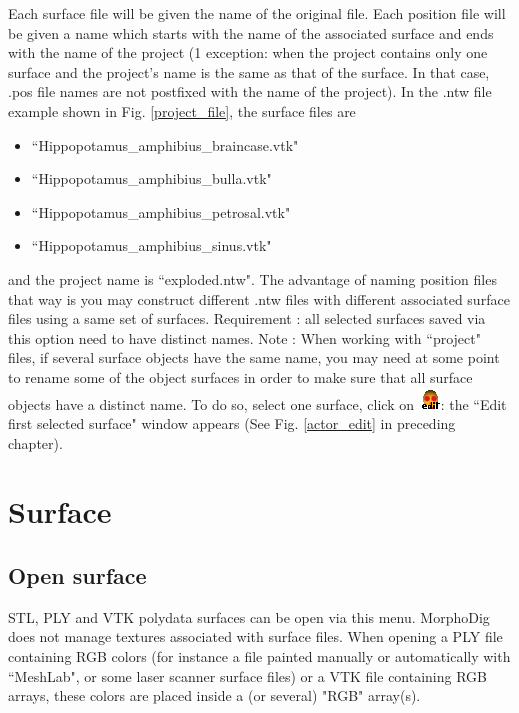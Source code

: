 Each surface file will be given the name of the original file. Each position file will be given a name which starts with the name of the associated surface and ends with the name of the project (1 exception: when the project contains only one surface and  the project's name is the same as that of the surface. In that case, .pos file names are not postfixed with the name of the project). In the .ntw file example shown in Fig. \ref{project_file}, the surface files are 
\begin{itemize}
\item ``Hippopotamus\_amphibius\_braincase.vtk" 
\item ``Hippopotamus\_amphibius\_bulla.vtk" 
\item ``Hippopotamus\_amphibius\_petrosal.vtk" 
\item ``Hippopotamus\_amphibius\_sinus.vtk" 
\end{itemize}
\noindent and the project name is ``exploded.ntw". The advantage of naming position files that way is you may construct different .ntw files with different associated surface files using a same set of surfaces. Requirement : all selected surfaces saved via this option
need to have distinct names. Note : When working with ``project" files, if several surface objects have the same name, you may need at
some point to rename some of the object surfaces in order to make sure that all surface objects have a distinct name. To do so, select one surface, click on \includegraphics[scale=0.7]{images/06/objects/actor_edit.png}: the ``Edit first selected surface" window appears (See Fig. \ref{actor_edit} in preceding chapter).




\section{Surface}
\subsection{Open surface}
STL, PLY and VTK polydata surfaces can be open via this menu. MorphoDig does not manage textures associated with surface files. When opening a PLY file containing RGB colors (for instance a file painted manually or automatically with ``MeshLab", or some laser scanner surface files) or a VTK file containing RGB arrays, these colors are placed inside a (or several) "RGB" array(s). 

